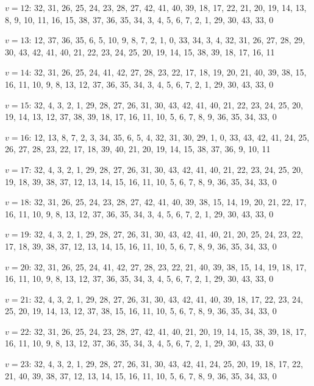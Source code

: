 \documentclass{amcjoucc}
\begin{document}
\begin{itemize}
{\item $v = 12$: 32, 31, 26, 25, 24, 23, 28, 27, 42, 41, 40, 39, 18, 17, 22, 21, 20, 19, 14, 13, 8, 9, 10, 11, 16, 15, 38, 37, 36, 35, 34, 3, 4, 5, 6, 7, 2, 1, 29, 30, 43, 33, 0
\item $v = 13$: 12, 37, 36, 35, 6, 5, 10, 9, 8, 7, 2, 1, 0, 33, 34, 3, 4, 32, 31, 26, 27, 28, 29, 30, 43, 42, 41, 40, 21, 22, 23, 24, 25, 20, 19, 14, 15, 38, 39, 18, 17, 16, 11
\item $v = 14$: 32, 31, 26, 25, 24, 41, 42, 27, 28, 23, 22, 17, 18, 19, 20, 21, 40, 39, 38, 15, 16, 11, 10, 9, 8, 13, 12, 37, 36, 35, 34, 3, 4, 5, 6, 7, 2, 1, 29, 30, 43, 33, 0
\item $v = 15$: 32, 4, 3, 2, 1, 29, 28, 27, 26, 31, 30, 43, 42, 41, 40, 21, 22, 23, 24, 25, 20, 19, 14, 13, 12, 37, 38, 39, 18, 17, 16, 11, 10, 5, 6, 7, 8, 9, 36, 35, 34, 33, 0
\item $v = 16$: 12, 13, 8, 7, 2, 3, 34, 35, 6, 5, 4, 32, 31, 30, 29, 1, 0, 33, 43, 42, 41, 24, 25, 26, 27, 28, 23, 22, 17, 18, 39, 40, 21, 20, 19, 14, 15, 38, 37, 36, 9, 10, 11
\item $v = 17$: 32, 4, 3, 2, 1, 29, 28, 27, 26, 31, 30, 43, 42, 41, 40, 21, 22, 23, 24, 25, 20, 19, 18, 39, 38, 37, 12, 13, 14, 15, 16, 11, 10, 5, 6, 7, 8, 9, 36, 35, 34, 33, 0
\item $v = 18$: 32, 31, 26, 25, 24, 23, 28, 27, 42, 41, 40, 39, 38, 15, 14, 19, 20, 21, 22, 17, 16, 11, 10, 9, 8, 13, 12, 37, 36, 35, 34, 3, 4, 5, 6, 7, 2, 1, 29, 30, 43, 33, 0
\item $v = 19$: 32, 4, 3, 2, 1, 29, 28, 27, 26, 31, 30, 43, 42, 41, 40, 21, 20, 25, 24, 23, 22, 17, 18, 39, 38, 37, 12, 13, 14, 15, 16, 11, 10, 5, 6, 7, 8, 9, 36, 35, 34, 33, 0
\item $v = 20$: 32, 31, 26, 25, 24, 41, 42, 27, 28, 23, 22, 21, 40, 39, 38, 15, 14, 19, 18, 17, 16, 11, 10, 9, 8, 13, 12, 37, 36, 35, 34, 3, 4, 5, 6, 7, 2, 1, 29, 30, 43, 33, 0
\item $v = 21$: 32, 4, 3, 2, 1, 29, 28, 27, 26, 31, 30, 43, 42, 41, 40, 39, 18, 17, 22, 23, 24, 25, 20, 19, 14, 13, 12, 37, 38, 15, 16, 11, 10, 5, 6, 7, 8, 9, 36, 35, 34, 33, 0
\item $v = 22$: 32, 31, 26, 25, 24, 23, 28, 27, 42, 41, 40, 21, 20, 19, 14, 15, 38, 39, 18, 17, 16, 11, 10, 9, 8, 13, 12, 37, 36, 35, 34, 3, 4, 5, 6, 7, 2, 1, 29, 30, 43, 33, 0
\item $v = 23$: 32, 4, 3, 2, 1, 29, 28, 27, 26, 31, 30, 43, 42, 41, 24, 25, 20, 19, 18, 17, 22, 21, 40, 39, 38, 37, 12, 13, 14, 15, 16, 11, 10, 5, 6, 7, 8, 9, 36, 35, 34, 33, 0
}
\end{itemize}
\end{document}
